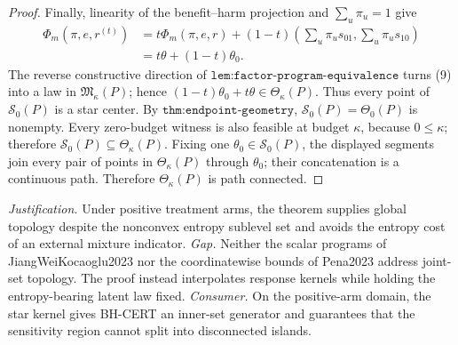 \documentclass{article}
\begin{document}
\begin{proof}
Finally, linearity of the benefit--harm projection and \(\sum_u\pi_u=1\) give
\[
\begin{aligned}
\Phi_m(\pi,e,r^{(t)})
&=t\Phi_m(\pi,e,r)
 +(1-t)\left(\sum_u\pi_us_{01},\sum_u\pi_us_{10}\right)\\
&=t\theta+(1-t)\theta_0.
\end{aligned}
\tag{9}
\]
The reverse constructive direction of \(\texttt{lem:factor-program-equivalence}\) turns (9) into a law in \(\mathfrak M_\kappa(P)\); hence \((1-t)\theta_0+t\theta\in\Theta_\kappa(P)\).  Thus every point of \(\mathcal S_0(P)\) is a star center.  By \(\texttt{thm:endpoint-geometry}\), \(\mathcal S_0(P)=\Theta_0(P)\) is nonempty.  Every zero-budget witness is also feasible at budget \(\kappa\), because \(0\leq\kappa\); therefore \(\mathcal S_0(P)\subseteq\Theta_\kappa(P)\).  Fixing one \(\theta_0\in\mathcal S_0(P)\), the displayed segments join every pair of points in \(\Theta_\kappa(P)\) through \(\theta_0\); their concatenation is a continuous path.  Therefore \(\Theta_\kappa(P)\) is path connected.
\end{proof}
\par\smallskip\noindent \textit{Justification.} Under positive treatment arms, the theorem supplies global topology despite the nonconvex entropy sublevel set and avoids the entropy cost of an external mixture indicator. \textit{Gap.} Neither the scalar programs of JiangWeiKocaoglu2023 nor the coordinatewise bounds of Pena2023 address joint-set topology. The proof instead interpolates response kernels while holding the entropy-bearing latent law fixed. \textit{Consumer.} On the positive-arm domain, the star kernel gives BH-CERT an inner-set generator and guarantees that the sensitivity region cannot split into disconnected islands.
\end{document}
